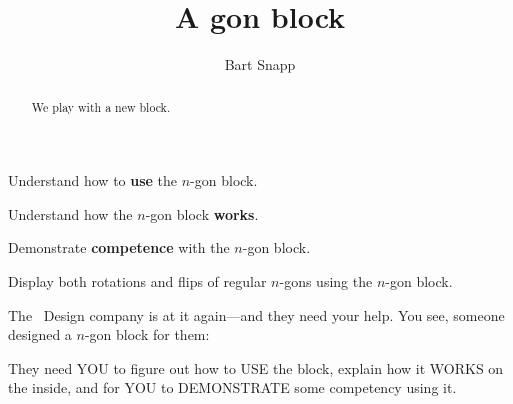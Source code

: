 \documentclass[noauthor,nooutcomes,handout]{ximera}
\title{A gon block}
\author{Bart Snapp}
\begin{document}
\begin{abstract}
  We play with a new block.
\end{abstract}
\maketitle

\begin{listOutcomes}
\item Understand how to \textbf{use} the $n$-gon block.
\item Understand how the $n$-gon block \textbf{works}.
\item Demonstrate \textbf{competence} with the $n$-gon block.
\item Display both rotations and flips of regular $n$-gons using the
  $n$-gon block.
\end{listOutcomes}



The \mooculus\ Design company is at it again---and they need your
help. You see, someone designed a $n$-gon block for them:


They need YOU to figure out how to USE the block, explain how it WORKS
on the inside, and for YOU to DEMONSTRATE some competency using it.
\mynewpage
\end{document}
